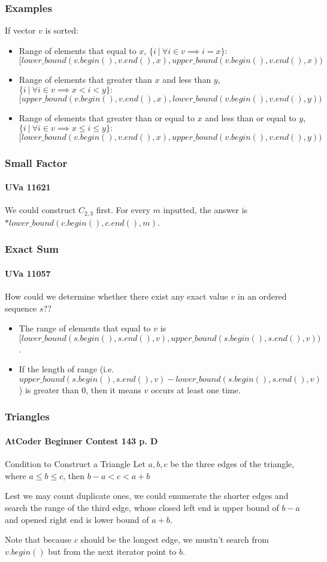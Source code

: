 \documentclass{beamer}
\begin{document}
\frame
{
	\frametitle{Examples}
	
	If vector $v$ is sorted:\pause
	
	\begin{itemize}
		\item Range of elements that equal to $x$, $\{i\ |\ \forall i\in v\implies i = x\}:$\\\pause
		$[lower\_bound(v.begin(), v.end(), x), upper\_bound(v.begin(), v.end(), x))$\pause
		\item Range of elements that greater than $x$ and less than $y$, $\{i\ |\ \forall i\in v\implies x < i < y\}:$\\\pause
		$[upper\_bound(v.begin(), v.end(), x), lower\_bound(v.begin(), v.end(), y))$\pause
		\item Range of elements that greater than or equal to $x$ and less than or equal to $y$, $\{i\ |\ \forall i\in v\implies x\leq i\leq y\}:$\\\pause
		$[lower\_bound(v.begin(), v.end(), x), upper\_bound(v.begin(), v.end(), y))$
	\end{itemize}
}

\frame
{
	\frametitle{Small Factor}
	\framesubtitle{UVa 11621}
	
	We could construct $C_{2,3}$ first. For every $m$ inputted, the answer is $*lower\_bound(c.begin(), c.end(), m)$.
}

\frame
{
	\frametitle{Exact Sum}
	\framesubtitle{UVa 11057}
	
	How could we determine whether there exist any exact value $v$ in an ordered sequence $s$??\pause
	
	\begin{itemize}
		\item The range of elements that equal to $v$ is $[lower\_bound(s.begin(), s.end(), v), upper\_bound(s.begin(), s.end(), v))$.\pause
		\item If the length of range (i.e. $upper\_bound(s.begin(), s.end(), v) - lower\_bound(s.begin(), s.end(), v)$) is greater than $0$, then it means $v$ occurs at least one time.
	\end{itemize}
}

\frame
{
	\frametitle{Triangles}
	\framesubtitle{AtCoder Beginner Contest 143 p. D}
	
	\begin{block}{Condition to Construct a Triangle}
		Let $a, b, c$ be the three edges of the triangle, where $a\leq b\leq c$, then $b - a < c < a + b$
	\end{block}
	
	\pause
	
	Lest we may count duplicate ones, we could enumerate the shorter edges and search the range of the third edge, whose closed left end is upper bound of $b-a$ and opened right end is lower bound of $a+b$.\pause
	
	Note that because $c$ should be the longest edge, we mustn't search from $v.begin()$ but from the next iterator point to $b$.
}
\end{document}
